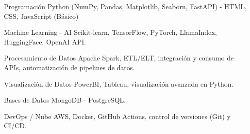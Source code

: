 


\begin{cvskills}


\cvskill
{Programación} %
{Python (NumPy, Pandas, Matplotlib, Seaborn, FastAPI) - HTML, CSS, JavaScript (Básico)} %


\cvskill
{Machine Learning - AI} %
{Scikit-learn, TensorFlow, PyTorch, LlamaIndex, HuggingFace, OpenAI API.} %


\cvskill
{Procesamiento de Datos} %
{Apache Spark, ETL/ELT, integración y consumo de APIs, automatización de pipelines de datos.} %


\cvskill
{Visualización de Datos} %
{PowerBI, Tableau, visualización avanzada en Python.} %


\cvskill
{Bases de Datos} %
{MongoDB - PostgreSQL.} %


\cvskill
{DevOps / Nube} %
{AWS, Docker, GitHub Actions, control de versiones (Git) y CI/CD.} %




\end{cvskills}